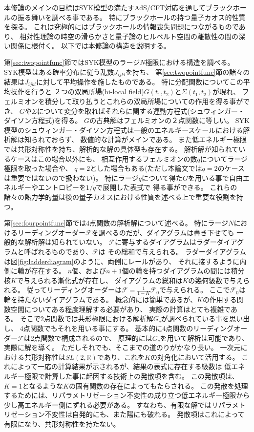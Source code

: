本修論のメインの目標はSYK模型の満たすAdS/CFT対応を通してブラックホールの振る舞いを調べる事である。
特にブラックホールの持つ量子カオス的性質を探る。
これは究極的にはブラックホールの情報喪失問題につながるものであり、
相対性理論の時空の滑らかさと量子論のヒルベルト空間の離散性の間の深い関係に根付く\cite{stanford_chaos}。
以下では本修論の構造を説明する。

第\ref{sec:twopointfunc}節ではSYK模型のラージ$N$極限における構造を調べる。
SYK模型はある確率分布に従う乱数$J_{ijkl}$を持ち、
第\ref{sec:twopointfunc}節の諸々の結果は$J_{ijkl}$に対して平均操作を施したものである。
特に分配関数についてこの平均操作を行うと
２つの双局所場(bi-local field)$G(t_1, t_2)$と$\Sigma(t_1, t_2)$が現れ、
フェルミオンを積分して取り払うとこれらの双局所場についての作用を得る事ができ、
$G$や$\Sigma$について変分を取ればそれらに関する運動方程式(シュウィンガー・ダイソン方程式)を得る。
$G$の古典解はフェルミオンの２点関数に等しい。
SYK模型のシュウィンガー・ダイソン方程式は一般のエネルギースケールにおける解析解は知られておらず、
数値的な計算がメインである。
また低エネルギー極限では共形対称性を持ち、解析的な解の具体型も存在する。
解析解が知られているケースはこの場合以外にも、
相互作用するフェルミオンの数$q$についてラージ極限を取った場合や、
$q=2$とした場合もある(ただし本論文では$q=2$のケースは重要ではないので扱わない)。
特にラージ$q$について得た$G$を用いる事で自由エネルギーやエントロピーを$1/q$で展開した表式で
得る事ができる。
これらの諸々の熱力学的量は後の量子カオスにおける性質を述べる上で重要な役割を持つ。

第\ref{sec:fourpointfunc}節では4点関数の解析解について述べる。
特にラージ$N$におけるリーディングオーダー$\mathcal{F}$を調べるのだが、ダイアグラムは書き下せても
一般的な解析解は知られていない。
$\mathcal{F}$に寄与するダイアグラムはラダーダイアグラムと呼ばれるものであり、$\mathcal{F}$は
その総和で与えられる。
ラダーダイアグラムは図\ref{fig:ladderdiagram}のように、両側にレールがあり、
それに接するように内側に輪が存在する。
$n$個、および$n+1$個の輪を持つダイアグラムの間には積分核$K$で与えられる漸化式が存在し、
ダイアグラムの総和は$K$の幾何級数で与えられる。
従ってリーディングオーダーは$\mathcal{F} = \frac{1}{1-K}\mathcal{F}_0$で与えられる。
ここで$\mathcal{F}_0$は輪を持たないダイアグラムである。
概念的には簡単であるが、$K$の作用する関数空間についてある程度理解する必要があり、
実際の計算はとても複雑である。
そこで2点関数では共形極限における解析解$G_c$が調べられている事を思い出し、
4点関数でもそれを用いる事にする。
基本的に4点関数のリーディングオーダー$\mathcal{F}$は2点関数で構成されるので、
原理的には$G_c$を用いて解析は可能であり、実際に解を導く。
ただしそれでも、そこまでの道のりがかなり長い。
一次元における共形対称性は$SL(2, \mathbb{R})$であり、これを$K$の対角化において活用する。
これによって一応の計算結果が示されるが、結果の表式に存在する級数は
低エネルギー極限で計算した事に起因する技術上の発散項を含む。
この発散項は、$K = 1$となるような$K$の固有関数の存在によってもたらされる。
この発散を処理するためには、リパラメトリゼーション不変性の成り立つ低エネルギー極限から
少し高エネルギー側にずれる必要がある。
すなわち、有限な解ではリパラメトリゼーション不変性は自発的にも、また陽にも破れる。
発散項はこれによって有限になり、共形対称性を持たない。

